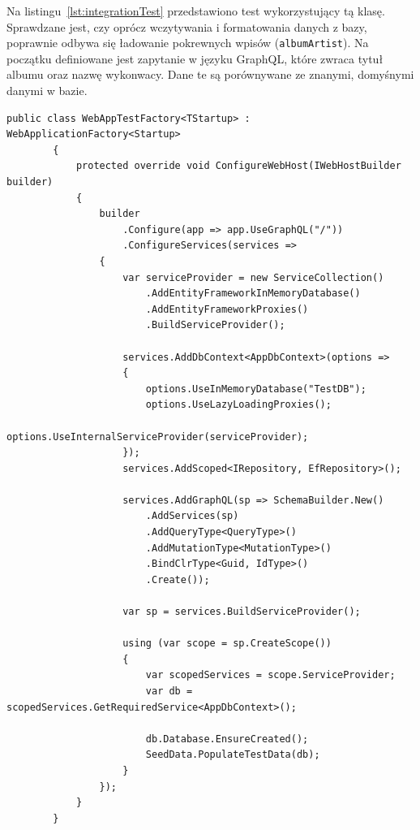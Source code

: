	Na listingu~\ref{lst:integrationTest} przedstawiono test wykorzystujący tą klasę.
	Sprawdzane jest, czy oprócz wczytywania i formatowania danych z bazy, poprawnie odbywa się ładowanie pokrewnych wpisów (\verb|albumArtist|).
	Na początku definiowane jest zapytanie w języku GraphQL, które
	zwraca tytuł albumu oraz nazwę wykonwacy.
	Dane te są porównywane ze znanymi, domyśnymi danymi w bazie.


	\begin{lstlisting}[label=lst:testServer, caption=Serwer do testów, float=h]
		public class WebAppTestFactory<TStartup> : WebApplicationFactory<Startup>
		{
			protected override void ConfigureWebHost(IWebHostBuilder builder)
			{
				builder
					.Configure(app => app.UseGraphQL("/"))
					.ConfigureServices(services =>
				{
					var serviceProvider = new ServiceCollection()
						.AddEntityFrameworkInMemoryDatabase()
						.AddEntityFrameworkProxies()
						.BuildServiceProvider();
	
					services.AddDbContext<AppDbContext>(options =>
					{
						options.UseInMemoryDatabase("TestDB");
						options.UseLazyLoadingProxies();
						options.UseInternalServiceProvider(serviceProvider);
					});
					services.AddScoped<IRepository, EfRepository>();
	
					services.AddGraphQL(sp => SchemaBuilder.New()
						.AddServices(sp)
						.AddQueryType<QueryType>()
						.AddMutationType<MutationType>()
						.BindClrType<Guid, IdType>()
						.Create());
	
					var sp = services.BuildServiceProvider();
	
					using (var scope = sp.CreateScope())
					{
						var scopedServices = scope.ServiceProvider;
						var db = scopedServices.GetRequiredService<AppDbContext>();
	
						db.Database.EnsureCreated();
						SeedData.PopulateTestData(db);
					}
				});
			}
		}
	\end{lstlisting}

